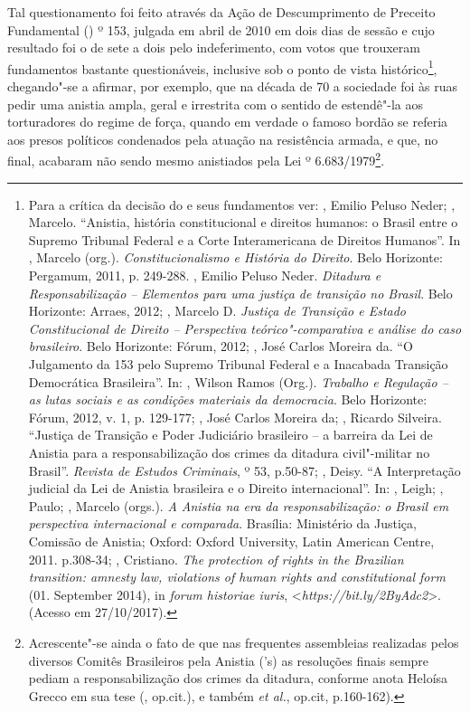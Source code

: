 Tal questionamento foi feito através da Ação de Descumprimento de
Preceito Fundamental () º 153, julgada em abril de 2010 em dois
dias de sessão e cujo resultado foi o de sete a dois pelo indeferimento,
com votos que trouxeram fundamentos bastante questionáveis, inclusive
sob o ponto de vista histórico\footnote{Para a crítica da decisão do 
  e seus fundamentos ver: , Emilio Peluso Neder; , Marcelo.
  ``Anistia, história constitucional e direitos humanos: o Brasil entre o
  Supremo Tribunal Federal e a Corte Interamericana de Direitos Humanos''.
  In , Marcelo (org.). \emph{Constitucionalismo e História do
  Direito}. Belo Horizonte: Pergamum, 2011, p. 249-288. , Emilio
  Peluso Neder. \emph{Ditadura e Responsabilização -- Elementos para
  uma justiça de transição no Brasil}. Belo Horizonte: Arraes, 2012;
  , Marcelo D. \emph{Justiça de Transição e Estado
  Constitucional de Direito -- Perspectiva teórico"-comparativa e análise
  do caso brasileiro}. Belo Horizonte: Fórum, 2012;  , José
  Carlos Moreira da. ``O Julgamento da  153 pelo Supremo Tribunal
  Federal e a Inacabada Transição Democrática Brasileira''. In: ,
  Wilson Ramos (Org.). \emph{Trabalho e Regulação -- as lutas sociais e
  as condições materiais da democracia}. Belo Horizonte: Fórum, 2012,
  v. 1, p. 129-177;  , José Carlos
  Moreira da; , Ricardo
  Silveira. ``Justiça de Transição e Poder Judiciário brasileiro -- a
  barreira da Lei de Anistia para a responsabilização dos crimes da
  ditadura civil"-militar no Brasil''. \emph{Revista de Estudos
  Criminais}, º 53, p.50-87; ,
  Deisy. ``A Interpretação judicial da
  Lei de Anistia brasileira e o Direito internacional''. In: , Leigh;
  , Paulo; , Marcelo (orgs.). \emph{A Anistia na era da
  responsabilização: o Brasil em perspectiva internacional e comparada}.
  Brasília: Ministério da Justiça, Comissão de Anistia; Oxford: Oxford
  University, Latin American Centre, 2011. p.308-34; ,
  Cristiano. \emph{The protection of rights in the Brazilian transition:
  amnesty law, violations of human rights and constitutional form} (01.
  September 2014), in \emph{forum historiae
  iuris}, \textless{}\emph{https://bit.ly/2ByAdc2}\textgreater{}.
  (Acesso em 27/10/2017).}, chegando"-se a afirmar, por exemplo, que na
década de 70 a sociedade foi às ruas pedir uma anistia ampla, geral e
irrestrita com o sentido de estendê"-la aos torturadores do regime de
força, quando em verdade o famoso bordão se referia aos presos políticos
condenados pela atuação na resistência armada, e que, no final, acabaram
não sendo mesmo anistiados pela Lei º 6.683/1979\footnote{Acrescente"-se
  ainda o fato de que nas frequentes assembleias realizadas pelos
  diversos Comitês Brasileiros pela Anistia ('s) as resoluções finais
  sempre pediam a responsabilização dos crimes da ditadura, conforme
  anota Heloísa Grecco em sua tese (, op.cit.), e também 
  \emph{et al.}, op.cit, p.160-162).}.

